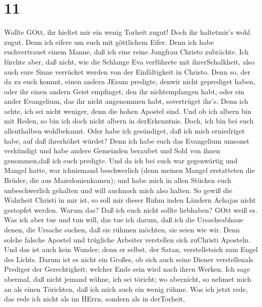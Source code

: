 \hypertarget{section-10}{%
\section{11}\label{section-10}}

 Wollte GOtt, ihr hieltet mir ein wenig Torheit zugut! Doch
ihr haltetmir's wohl zugut.  Denn ich eifere um euch mit
göttlichem Eifer. Denn ich habe euchvertrauet einem Manne, daß ich eine
reine Jungfrau Christo zubrächte.  Ich fürchte aber, daß
nicht, wie die Schlange Eva verführete mit ihrerSchalkheit, also auch
eure Sinne verrücket werden von der Einfältigkeit in Christo.
 Denn so, der da zu euch kommt, einen andern JEsum predigte,
denwir nicht geprediget haben, oder ihr einen andern Geist empfinget,
den ihr nichtempfangen habt, oder ein ander Evangelium, das ihr nicht
angenommen habt, sovertrüget ihr's.  Denn ich achte, ich sei
nicht weniger, denn die hohen Apostel sind.  Und ob ich
albern bin mit Reden, so bin ich doch nicht albern in derErkenntnis.
Doch, ich bin bei euch allenthalben wohlbekannt.  Oder habe
ich gesündiget, daß ich mich erniedriget habe, auf daß ihrerhöhet
würdet? Denn ich habe euch das Evangelium umsonst verkündigt
 und habe andere Gemeinden beraubet und Sold von ihnen
genommen,daß ich euch predigte.  Und da ich bei euch war
gegenwärtig und Mangel hatte, war ichniemand beschwerlich (denn meinen
Mangel erstatteten die Brüder, die aus Mazedonienkamen); und habe mich
in allen Stücken euch unbeschwerlich gehalten und will auchnoch mich
also halten.  So gewiß die Wahrheit Christi in mir ist, so
soll mir dieser Ruhm inden Ländern Achajas nicht gestopfet werden.
 Warum das? Daß ich euch nicht sollte liebhaben? GOtt weiß
es.  Was ich aber tue und tun will, das tue ich darum, daß
ich die Ursacheabhaue denen, die Ursache suchen, daß sie rühmen möchten,
sie seien wie wir.  Denn solche falsche Apostel und
trügliche Arbeiter verstellen sich zuChristi Aposteln.  Und
das ist auch kein Wunder; denn er selbst, der Satan, verstelletsich zum
Engel des Lichts.  Darum ist es nicht ein Großes, ob sich
auch seine Diener verstellenals Prediger der Gerechtigkeit; welcher Ende
sein wird nach ihren Werken.  Ich sage abermal, daß nicht
jemand wähne, ich sei töricht; wo abernicht, so nehmet mich an als einen
Törichten, daß ich mich auch ein wenig rühme.  Was ich
jetzt rede, das rede ich nicht als im HErrn, sondern als in derTorheit,
